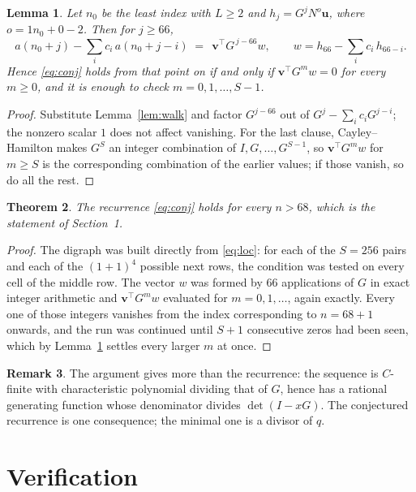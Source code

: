 \documentclass[11pt,a4paper]{article}
\theoremstyle{plain}
\newtheorem{theorem}{Theorem}
\newtheorem{lemma}[theorem]{Lemma}
\theoremstyle{definition}
\newtheorem{remark}[theorem]{Remark}
\begin{document}
\begin{lemma}\label{lem:crit}
Let $n_0$ be the least index with $L\ge2$ and $h_j=G^{j}N^{o}\mathbf{u}$, where
$o=1n_0+0-2$. Then for $j\ge66$,
\[
a(n_0+j)-\sum_i c_i\,a(n_0+j-i)\;=\;\,\mathbf{v}^{\!\top}G^{\,j-66}w,
\qquad w=h_{66}-\sum_i c_i\,h_{66-i} .
\]
Hence \eqref{eq:conj} holds from that point on if and only if
$\mathbf{v}^{\!\top}G^{m}w=0$ for every $m\ge0$, and it is enough to check
$m=0,1,\dots,S-1$.
\end{lemma}

\begin{proof}
Substitute Lemma~\ref{lem:walk} and factor $G^{j-66}$ out of
$G^{j}-\sum_ic_iG^{j-i}$; the nonzero scalar $1$ does not affect
vanishing. For the last clause, Cayley--Hamilton makes $G^{S}$ an integer combination of
$I,G,\dots,G^{S-1}$, so $\mathbf{v}^{\!\top}G^{m}w$ for $m\ge S$ is the corresponding
combination of the earlier values; if those vanish, so do all the rest.
\end{proof}

\begin{theorem}
The recurrence \eqref{eq:conj} holds for every $n>68$, which is the statement of
Section~1.
\end{theorem}

\begin{proof}
The digraph was built directly from \eqref{eq:loc}: for each of the $S=256$ pairs and each
of the $(1+1)^{4}$ possible next rows, the condition was tested on every cell of
the middle row. The vector $w$ was formed by $66$ applications of $G$ in exact integer
arithmetic and $\mathbf{v}^{\!\top}G^{m}w$ evaluated for $m=0,1,\dots$, again exactly.
Every one of those integers vanishes from the index corresponding to $n=68+1$ onwards,
and the run was continued until $S+1$ consecutive zeros had been seen, which by
Lemma~\ref{lem:crit} settles every larger $m$ at once.
\end{proof}

\begin{remark}
The argument gives more than the recurrence: the sequence is $C$-finite with characteristic
polynomial dividing that of $G$, hence has a rational generating function whose denominator
divides $\det(I-xG)$. The conjectured recurrence is one consequence; the minimal one is a
divisor of $q$.
\end{remark}

\section{Verification}
\end{document}
